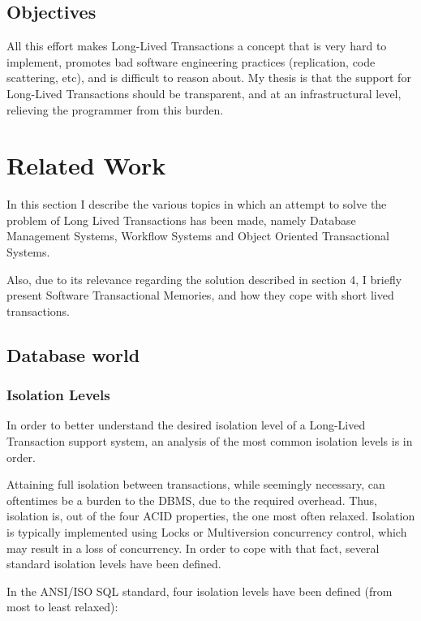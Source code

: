 \documentclass{llncs}
\begin{document}
\subsection{Objectives}

All this effort makes Long-Lived Transactions a concept that is very
hard to implement, promotes bad software engineering practices
(replication, code scattering, etc), and is difficult to reason
about. My thesis is that the support for Long-Lived Transactions
should be transparent, and at an infrastructural level, relieving the
programmer from this burden.

\section{Related Work}

In this section I describe the various topics in which an attempt to
solve the problem of Long Lived Transactions has been made, namely
Database Management Systems, Workflow Systems and Object Oriented
Transactional Systems.

Also, due to its relevance regarding the solution described in section
4, I briefly present Software Transactional Memories, and how they
cope with short lived transactions.

\subsection{Database world}
\label{sec:rdbms}

\subsubsection{Isolation Levels}
\label{sec:isolation}

In order to better understand the desired isolation level of a
Long-Lived Transaction support system, an analysis of the most common
isolation levels is in order.

Attaining full isolation between transactions, while seemingly
necessary, can oftentimes be a burden to the DBMS, due to the required
overhead. Thus, isolation is, out of the four ACID properties, the one
most often relaxed. Isolation is typically implemented using Locks or
Multiversion concurrency control, which may result in a loss of
concurrency. In order to cope with that fact, several standard
isolation levels have been defined.

In the ANSI/ISO SQL standard\cite{melton1992ansi}, four isolation
levels have been defined (from most to least relaxed):
\end{document}
